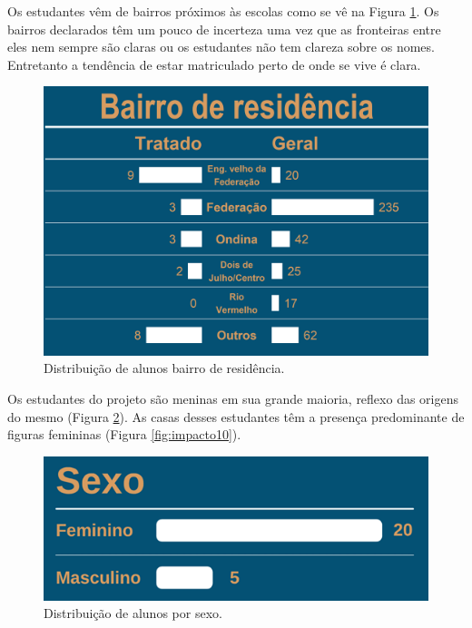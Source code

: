 \documentclass[
]{book}
\begin{document}
Os estudantes vêm de bairros próximos às escolas como se vê na Figura \ref{fig:impacto08}. Os bairros declarados têm um pouco de incerteza uma vez que as fronteiras entre eles nem sempre são claras ou os estudantes não tem clareza sobre os nomes. Entretanto a tendência de estar matriculado perto de onde se vive é clara.

\begin{figure}

{\centering \includegraphics[width=0.75\linewidth,height=0.75\textheight]{images/Impactos/08} 

}

\caption{Distribuição de alunos bairro de residência.}\label{fig:impacto08}
\end{figure}

Os estudantes do projeto são meninas em sua grande maioria, reflexo das origens do mesmo (Figura \ref{fig:impacto09}). As casas desses estudantes têm a presença predominante de figuras femininas (Figura \ref{fig:impacto10}).

\begin{figure}

{\centering \includegraphics[width=0.75\linewidth,height=0.75\textheight]{images/Impactos/09} 

}

\caption{Distribuição de alunos por sexo.}\label{fig:impacto09}
\end{figure}
\end{document}
